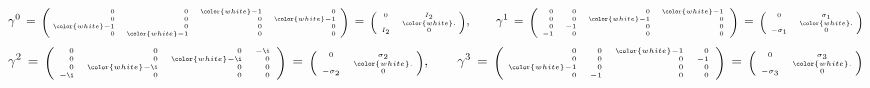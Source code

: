 
\begin{equation*}
\gamma^{0}
\,=\,
	\textnormal{\tiny$\left(\!\!\begin{array}{rrrr}
		0 & 0 & {\color{white}-}1 & 0 \\
		0 & 0 & 0 & {\color{white}-}1 \\
		{\color{white}-}1 & 0 & 0 & 0 \\
		0 & {\color{white}-}1 & 0 & 0
		\end{array}\!\right)$}
\,=\,
	\textnormal{\tiny$\left(\!\begin{array}{cc}
		0 & I_{2} \\
		I_{2} & \overset{{\color{white}.}}{0} \\
		\end{array}\!\!\right)$},
\quad\quad
\gamma^{1}
\,=\,
	\textnormal{\tiny$\left(\!\begin{array}{rrrr}
		0 & 0 & 0 & {\color{white}-}1 \\
		0 & 0 & {\color{white}-}1 & 0 \\
		0 & -1 & 0 & 0 \\
		-1 & 0 & 0 & 0
		\end{array}\right)$}
\,=\,
	\textnormal{\tiny$\left(\!\begin{array}{cc}
		0 & \sigma_{1} \\
		-\sigma_{1} & \overset{{\color{white}.}}{0} \\
		\end{array}\!\!\right)$}
\end{equation*}
\begin{equation*}
\gamma^{2}
\,=\,
	\textnormal{\tiny$\left(\!\begin{array}{rrrr}
		0 & 0 & 0 & -\i \\
		0 & 0 & {\color{white}-}\i & 0 \\
		0 & {\color{white}-}\i & 0 & 0 \\
		-\i & 0 & 0 & 0
		\end{array}\right)$}
\,=\,
	\textnormal{\tiny$\left(\!\begin{array}{cc}
		0 & \sigma_{2} \\
		-\sigma_{2} & \overset{{\color{white}.}}{0} \\
		\end{array}\!\!\right)$},
\quad\quad
\gamma^{3}
\,=\,
	\textnormal{\tiny$\left(\!\begin{array}{rrrr}
		0 & 0 & {\color{white}-}1 & 0\\
		0 & 0 & 0 & -1 \\
		{\color{white}-}1 & 0 & 0 & 0 \\
		0 & -1 & 0 & 0
		\end{array}\right)$}
\,=\,
	\textnormal{\tiny$\left(\!\begin{array}{cc}
		0 & \sigma_{3} \\
		-\sigma_{3} & \overset{{\color{white}.}}{0} \\
		\end{array}\!\!\right)$}
\end{equation*}
